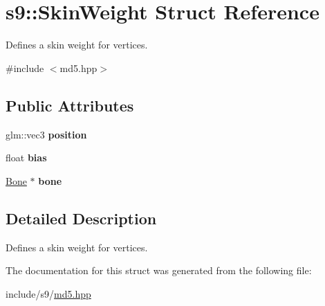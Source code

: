 \hypertarget{structs9_1_1SkinWeight}{\section{s9\-:\-:Skin\-Weight Struct Reference}
\label{structs9_1_1SkinWeight}
}


Defines a skin weight for vertices.  




{\ttfamily \#include $<$md5.\-hpp$>$}

\subsection*{Public Attributes}
\begin{DoxyCompactItemize}
\item 
\hypertarget{structs9_1_1SkinWeight_a7695eea561d50b3e038cc7cc5185df4a}{glm\-::vec3 {\bfseries position}}\label{structs9_1_1SkinWeight_a7695eea561d50b3e038cc7cc5185df4a}

\item 
\hypertarget{structs9_1_1SkinWeight_aa6db36aee4224a41bd40e62718b33385}{float {\bfseries bias}}\label{structs9_1_1SkinWeight_aa6db36aee4224a41bd40e62718b33385}

\item 
\hypertarget{structs9_1_1SkinWeight_ac7ac6a14886cb95d9240682bb3c20888}{\hyperlink{structs9_1_1Bone}{Bone} $\ast$ {\bfseries bone}}\label{structs9_1_1SkinWeight_ac7ac6a14886cb95d9240682bb3c20888}

\end{DoxyCompactItemize}


\subsection{Detailed Description}
Defines a skin weight for vertices. 

The documentation for this struct was generated from the following file\-:\begin{DoxyCompactItemize}
\item 
include/s9/\hyperlink{md5_8hpp}{md5.\-hpp}\end{DoxyCompactItemize}
